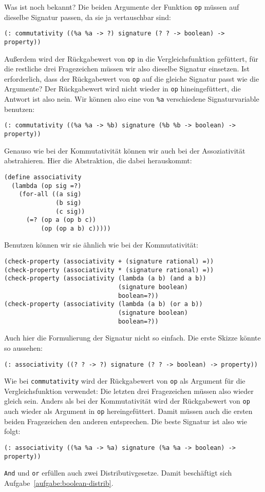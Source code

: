 Was ist noch bekannt?  Die beiden Argumente der Funktion \lstinline{op}
müssen auf dieselbe Signatur passen, da sie ja vertauschbar sind:
%
\begin{lstlisting}
(: commutativity ((%a %a -> ?) signature (? ? -> boolean) -> property))
\end{lstlisting}
%
Außerdem wird der Rückgabewert von \lstinline{op} in die
Vergleichsfunktion gefüttert, für die restliche drei Fragezeichen
müssen wir also dieselbe Signatur einsetzen.  Ist erforderlich, dass
der Rückgabewert von \lstinline{op} auf die gleiche Signatur passt wie die
Argumente?  Der Rückgabewert wird nicht wieder in \lstinline{op}
hineingefüttert, die Antwort ist also nein.  Wir können also eine
von \lstinline{%a} verschiedene Signaturvariable benutzen:
%
\begin{lstlisting}
(: commutativity ((%a %a -> %b) signature (%b %b -> boolean) -> property))
\end{lstlisting}
%
Genauso wie bei der Kommutativität können wir auch bei der
Assoziativität abstrahieren.  Hier die Abstraktion, die dabei
herauskommt:
%
\begin{lstlisting}
(define associativity
  (lambda (op sig =?)
    (for-all ((a sig)
              (b sig)
              (c sig))
      (=? (op a (op b c))
          (op (op a b) c)))))
\end{lstlisting}
%
Benutzen können wir sie ähnlich wie bei der Kommutativität:
%
\begin{lstlisting}
(check-property (associativity + (signature rational) =))
(check-property (associativity * (signature rational) =))
(check-property (associativity (lambda (a b) (and a b))
                               (signature boolean)
                               boolean=?))
(check-property (associativity (lambda (a b) (or a b))
                               (signature boolean)
                               boolean=?))
\end{lstlisting}
%
Auch hier die Formulierung der Signatur nicht so einfach.  Die erste
Skizze könnte so aussehen:
%
\begin{lstlisting}
(: associativity ((? ? -> ?) signature (? ? -> boolean) -> property))
\end{lstlisting}
%
Wie bei \lstinline{commutativity} wird der Rückgabewert von \lstinline{op}
als Argument für die Vergleichsfunktion verwendet: Die letzten drei
Fragezeichen müssen also wieder gleich sein.  Anders als bei der
Kommutativität wird der Rückgabewert von \lstinline{op} auch wieder als
Argument in \lstinline{op} hereingefüttert.  Damit müssen auch die ersten
beiden Fragezeichen den anderen entsprechen.  Die beste Signatur ist
also wie folgt:
%
\begin{lstlisting}
(: associativity ((%a %a -> %a) signature (%a %a -> boolean) -> property))
\end{lstlisting}
%
\lstinline{And} und
\lstinline{or} erfüllen auch zwei Distributivgesetze.  Damit beschäftigt
sich Aufgabe~\ref{aufgabe:boolean-distrib}.

